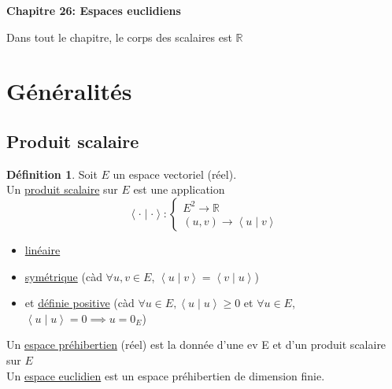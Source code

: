 \documentclass[10pt,a4paper]{article}
\theoremstyle{definition}
\newtheorem{definition}[proposition]{Définition}
\newcommand{\vp}[2]{\left< #1 \mid #2 \right>}
\begin{document}
\renewcommand{\labelitemi}{$*$}
\begin{center}
{\Large \textbf{Chapitre 26: Espaces euclidiens}}
\end{center}
Dans tout le chapitre, le corps des scalaires est $\mathbb{R}$

\section{Généralités}
\subsection{Produit scalaire}
\begin{definition}
Soit $E$ un espace vectoriel (réel). \\
Un \uline{produit scalaire} sur $E$ est une application
\[ \vp{\cdot}{\cdot} : \begin{cases}
E^2 \to \mathbb{R} \\
(u, v) \to \vp{u}{v}
\end{cases}\]
\begin{itemize}
\item \uline{linéaire}
\item \uline{symétrique} (càd $\forall u, v \in E$, $\vp{u}{v} = \vp{v}{u}$)
\item et \uline{définie positive} (càd $\forall u \in E, \vp{u}{u} \geq 0$ et $\forall u \in E$, $\vp{u}{u} = 0 \implies u = 0_E$)
\end{itemize}
Un \uline{espace préhibertien} (réel) est la donnée d'une ev E et d'un produit scalaire sur $E$ \\
Un \uline{espace euclidien} est un espace préhibertien de dimension finie.
\end{definition}
\end{document}

